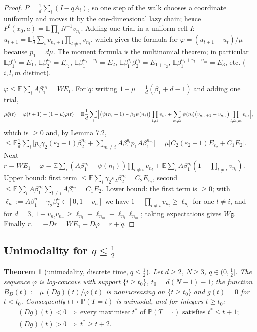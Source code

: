 \documentclass[11pt,a4paper]{article}
\newtheorem{theorem}{Theorem}[section]
\theoremstyle{definition}
\theoremstyle{remark}
\begin{document}
\begin{proof}
$P=\frac1d\sum_i(I-qA_i)$, so one step of the walk chooses a coordinate uniformly and moves it by the one-dimensional lazy chain; hence $P^t(x_0,a)=\mathbb E\prod_iN^{-1}v_{n_i}$. Adding one trial in a uniform cell $I$: $u_{t+1}=\mathbb E\frac1d\sum_iv_{n_i+1}\prod_{l\ne i}v_{n_l}$, which gives the formula for $\varphi=(u_{t+1}-u_t)/\mu$ because $p_1=d\mu$. The moment formula is the multinomial theorem; in particular $\mathbb E\beta_1^{n_i}=E_1$, $\mathbb E\beta_2^{n_i}=E_{\varepsilon_2}$, $\mathbb E\beta_1^{n_i+n_l}=E_2$, $\mathbb E\beta_1^{n_i}\beta_2^{n_l}=E_{1+\varepsilon_2}$, $\mathbb E\beta_1^{n_i+n_l+n_m}=E_3$, etc. ($i,l,m$ distinct).

$\varphi\le\mathbb E\sum_iA\beta_1^{n_i}=WE_1$. For $\tilde q$: writing $1-\mu=\frac1d(\beta_1+d-1)$ and adding one trial,
\begin{equation*}
\mu\tilde q(t)=\varphi(t+1)-(1-\mu)\varphi(t)=\mathbb E\frac1d\sum_i\Bigl[\bigl(\psi(n_i+1)-\beta_1\psi(n_i)\bigr)\prod_{l\ne i}v_{n_l}+\sum_{m\ne i}\psi(n_i)\bigl(v_{n_m+1}-v_{n_m}\bigr)\prod_{l\ne i,m}v_{n_l}\Bigr],
\end{equation*}
which is $\ge0$ and, by Lemma 7.2, $\le\mathbb E\frac1d\sum_i\bigl[p_2\gamma_2(\varepsilon_2-1)\beta_2^{n_i}+\sum_{m\ne i}A\beta_1^{n_i}p_1A\beta_1^{n_m}\bigr]=\mu\bigl[C_2(\varepsilon_2-1)E_{\varepsilon_2}+C_1E_2\bigr]$. Next $r=WE_1-\varphi=\mathbb E\sum_i(A\beta_1^{n_i}-\psi(n_i))\prod_{l\ne i}v_{n_l}+\mathbb E\sum_iA\beta_1^{n_i}(1-\prod_{l\ne i}v_{n_l})$. Upper bound: first term $\le\mathbb E\sum_i\gamma_2\varepsilon_2\beta_2^{n_i}=C_2E_{\varepsilon_2}$, second $\le\mathbb E\sum_iA\beta_1^{n_i}\sum_{l\ne i}A\beta_1^{n_l}=C_1E_2$. Lower bound: the first term is $\ge0$; with $\ell_n:=A\beta_1^n-\gamma_2\beta_2^n\in[0,1-v_n]$ we have $1-\prod_{l\ne i}v_{n_l}\ge\ell_{n_l}$ for one $l\ne i$, and for $d=3$, $1-v_{n_l}v_{n_m}\ge\ell_{n_l}+\ell_{n_m}-\ell_{n_l}\ell_{n_m}$; taking expectations gives $W\mathfrak g$. Finally $r_1=-Dr=WE_1+D\varphi=r+\tilde q$.
\end{proof}

\subsection{Unimodality for $q\le\frac12$}

\begin{theorem}[{unimodality, discrete time, $q\le\frac12$}]
Let $d\ge2$, $N\ge3$, $q\in(0,\frac12]$. The sequence $\varphi$ is log-concave with support $\{t\ge t_0\}$, $t_0=d(N-1)-1$; the function $B_D(t):=\mu\,(Dg)(t)/\varphi(t)$ is nonincreasing on $\{t\ge t_0\}$ and $g(t)=0$ for $t<t_0$. Consequently $t\mapsto\mathbb P(T=t)$ is unimodal, and for integers $t\ge t_0$:
\begin{gather*}
(Dg)(t)<0\ \Longrightarrow\ \text{every maximiser }t^*\text{ of }\mathbb P(T=\cdot)\text{ satisfies }t^*\le t+1; \\
(Dg)(t)>0\ \Longrightarrow\ t^*\ge t+2 .
\end{gather*}
\end{theorem}
\end{document}
